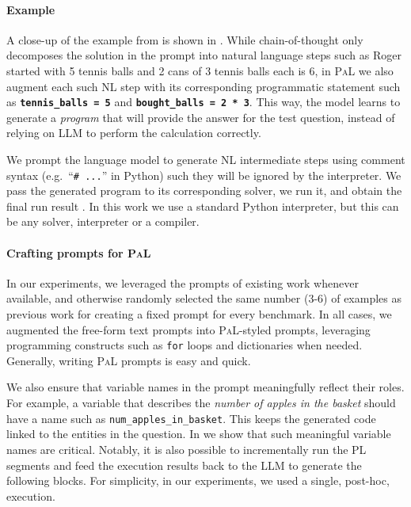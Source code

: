 \documentclass[dvipsnames]{article} \usepackage[accepted]{icml2022}
\newcommand{\ours}{\textsc{PaL}\xspace}
\newcommand{\inlineCode}[1]{\texttt{{#1}}}
\newcommand{\llm}{LLM\xspace}
\begin{document}
\paragraph{Example} A close-up of the example from  is shown in . While chain-of-thought only decomposes the solution in the prompt into natural language steps such as \colorbox{cotcolor}{Roger started with 5 tennis balls} and 
\colorbox{cotcolor}{2 cans of 3 tennis balls each is 6}, in \ours we also augment each such NL step with its corresponding programmatic statement such as 
\colorbox{parcolorback}{\color{parcolortext}\texttt{\textbf{tennis\_balls = 5}}} and 
\colorbox{parcolorback}{\color{parcolortext}\texttt{\textbf{bought\_balls = 2 * 3}}}. This way, the model learns to generate a \emph{program} that will provide the answer for the test question, instead of relying on \llm to perform the calculation correctly. 

We prompt the language model to generate NL intermediate steps using comment syntax (e.g.~``\inlineCode{\# ...}'' in Python) such they will be ignored by the interpreter. 
We pass the generated program 
to its corresponding solver,
we run it, and obtain the final run result .
In this work we use a standard Python interpreter, but this can be any solver, interpreter or a compiler.







\paragraph{Crafting prompts for \ours} 
In our experiments, we leveraged the prompts of existing work whenever available, and otherwise randomly selected the same number (3-6) of examples as previous work for creating a fixed prompt for every benchmark.
In all cases, we augmented the free-form text prompts 
into \ours-styled prompts, leveraging programming constructs such as \inlineCode{for} loops and dictionaries
when needed.
Generally, writing \ours prompts is easy and quick. 

We also ensure that variable names in the prompt meaningfully reflect their roles. 
For example, a variable that describes the \textit{number of apples in the basket} should have a name such as \inlineCode{num\_apples\_in\_basket}. This keeps the generated code 
linked to the entities in the question.
In  we show that such meaningful variable names are critical.
Notably, it is also possible to incrementally run the PL segments and feed the execution results back to the \llm to generate the following blocks.
For simplicity, in our experiments, we used a single, post-hoc, execution.
\end{document}

